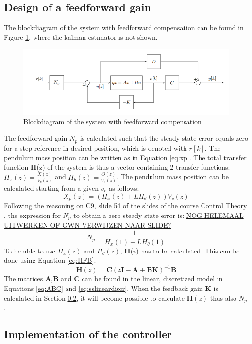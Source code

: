 \documentclass[a4paper,kul]{kulakarticle} %
\begin{document}
	\subsection{Design of a feedforward gain}
	
	The blockdiagram of the system with feedforward compensation can be found in Figure \ref{fig:blockdiagram}, where the kalman estimator is not shown. 
	
	\begin{figure}[htp!]
		\centering
		\includegraphics[width=.7\linewidth]{blockdiagram.png}
		\caption{Blockdiagram of the system with feedforward compensation }
		\label{fig:blockdiagram}
	\end{figure}
	The feedforward gain $N_p$ is calculated such that the steady-state error equals zero for a step reference in desired position, which is denoted with $r[k]$. The pendulum mass position can be written as in Equation \ref{eq:xp}. The total transfer function \textbf{H}(z) of the system is thus a vector containing 2 transfer functions: $H_x(z) = \frac{X(z)}{V_c(z)}$ and $H_{\theta}(z) = \frac{\Theta(z)}{V_c(z)}$. The pendulum mass position can be calculated starting from a given $v_c$ as follows:
	\begin{equation}
	X_p(z) = (H_x(z) + LH_\theta(z))V_c(z)
	\end{equation}
	Following the reasoning on C9, slide 54 of the slides of the course Control Theory \cite{slidescontroltheory}, the expression for $N_p$ to  obtain a zero steady state error is: \underline{NOG HELEMAAL UITWERKEN OF GWN VERWIJZEN NAAR SLIDE?}
	\begin{equation}
	N_p = \frac{1}{H_x(1) + LH_\theta(1)}
	\end{equation}
	To be able to use $H_x(z)$ and $H_\theta(z)$, \textbf{H}(z) has to be calculated. This can be done using Equation \ref{eq:HFB}. 
	\begin{equation}
	\mathbf{H}(z) = \mathbf{C}(z\mathbf{I}-\mathbf{A}+\mathbf{BK})^{-1}\mathbf{B}
	\label{eq:HFB}
	\end{equation}
	The matrices $\mathbf{A}$,$\mathbf{B}$ and $\mathbf{C}$ can be found in the linear, discretized model in Equations \ref{eq:ABC} and \ref{eq:sslineardiscr}. When the feedback gain $\mathbf{K}$ is calculated in Section \ref{sec:implFBcontr}, it will become possible to calculate $\mathbf{H}(z)$ thus also $N_p$. 
	\subsection{Implementation of the controller}
	\label{sec:implFBcontr}
	
	
	
	
\end{document}
